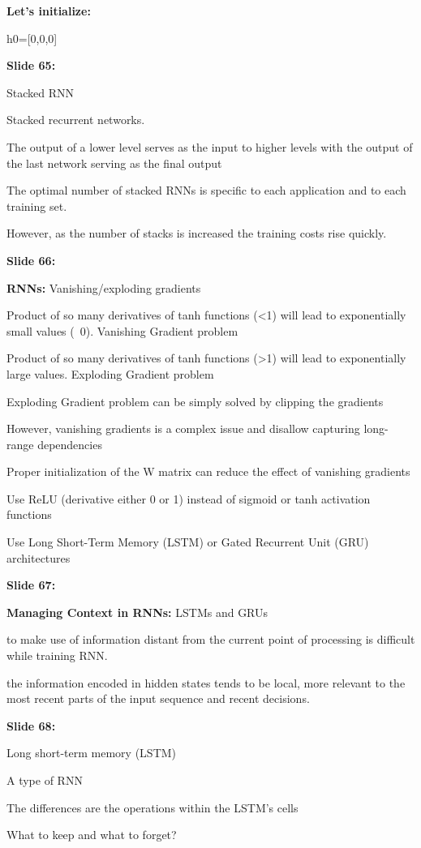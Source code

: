 \documentclass[11pt,a4paper]{article}
\begin{document}
\textbf{Let's initialize:} 

h0=[0,0,0]

\textbf{Slide 65:}

Stacked RNN

Stacked recurrent networks.

The output of a lower level serves as the input to higher levels with the output of the last network serving as the final output

The optimal number of stacked RNNs is specific to each application and to each training set.

However, as the number of stacks is increased the training costs rise quickly.

\textbf{Slide 66:}

\textbf{RNNs:}  Vanishing/exploding gradients

Product of so many derivatives of tanh functions (<1) will lead to exponentially small values (~0). Vanishing Gradient problem

Product of so many derivatives of tanh functions (>1) will lead to exponentially large values. Exploding Gradient problem

Exploding Gradient problem can be simply solved by clipping the gradients

However, vanishing gradients is a complex issue and disallow capturing long-range dependencies

Proper initialization of the W matrix can reduce the effect of vanishing gradients

Use ReLU (derivative either 0 or 1) instead of sigmoid or tanh activation functions

Use Long Short-Term Memory (LSTM) or Gated Recurrent Unit (GRU) architectures

\textbf{Slide 67:}

\textbf{Managing Context in RNNs:}  LSTMs and GRUs

to make use of information distant from the current point of processing is difficult while training RNN.

the information encoded in hidden states tends to be local, more relevant to the most recent parts of the input sequence and recent decisions.

\textbf{Slide 68:}

Long short-term memory (LSTM)

A type of RNN

The differences are the operations within the LSTM’s cells

What to keep and what to forget?
\end{document}
